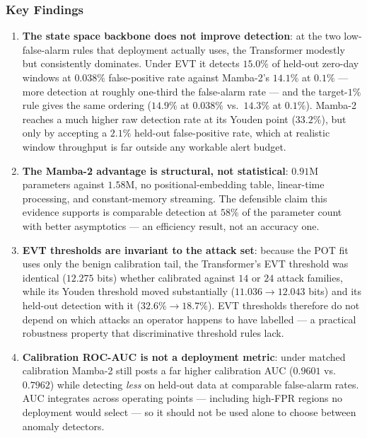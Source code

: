 \documentclass[10pt,journal,compsoc]{IEEEtran}
\begin{document}
\subsubsection{Key Findings}
\begin{enumerate}
    \item \textbf{The state space backbone does not improve detection}: at the two low-false-alarm rules that deployment actually uses, the Transformer modestly but consistently dominates. Under EVT it detects $15.0\%$ of held-out zero-day windows at $0.038\%$ false-positive rate against Mamba-2's $14.1\%$ at $0.1\%$ --- more detection at roughly one-third the false-alarm rate --- and the target-$1\%$ rule gives the same ordering ($14.9\%$ at $0.038\%$ vs.\ $14.3\%$ at $0.1\%$). Mamba-2 reaches a much higher raw detection rate at its Youden point ($33.2\%$), but only by accepting a $2.1\%$ held-out false-positive rate, which at realistic window throughput is far outside any workable alert budget.
    \item \textbf{The Mamba-2 advantage is structural, not statistical}: $0.91$M parameters against $1.58$M, no positional-embedding table, linear-time processing, and constant-memory streaming. The defensible claim this evidence supports is comparable detection at $58\%$ of the parameter count with better asymptotics --- an efficiency result, not an accuracy one.
    \item \textbf{EVT thresholds are invariant to the attack set}: because the POT fit uses only the benign calibration tail, the Transformer's EVT threshold was identical ($12.275$ bits) whether calibrated against $14$ or $24$ attack families, while its Youden threshold moved substantially ($11.036 \rightarrow 12.043$ bits) and its held-out detection with it ($32.6\% \rightarrow 18.7\%$). EVT thresholds therefore do not depend on which attacks an operator happens to have labelled --- a practical robustness property that discriminative threshold rules lack.
    \item \textbf{Calibration ROC-AUC is not a deployment metric}: under matched calibration Mamba-2 still posts a far higher calibration AUC ($0.9601$ vs.\ $0.7962$) while detecting \emph{less} on held-out data at comparable false-alarm rates. AUC integrates across operating points --- including high-FPR regions no deployment would select --- so it should not be used alone to choose between anomaly detectors.
\end{enumerate}
\end{document}
